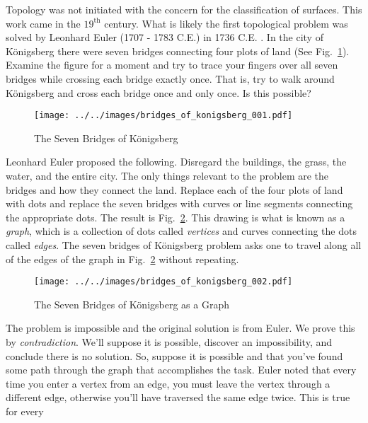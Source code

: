     Topology was not initiated with the concern for the classification of
    surfaces. This work came in the $19^{\textrm{th}}$ century. What is likely
    the first topological problem was solved by Leonhard Euler
    (1707 - 1783 C.E.) in 1736 C.E. \cite{LeonhardEulerBridgesOfKonigsberg}. In
    the city of K\"{o}nigsberg there were seven bridges connecting four plots of
    land (See Fig.~\ref{fig:bridges_of_konigsberg_001}). Examine the figure for
    a moment and try to trace your fingers over all seven bridges while crossing
    each bridge exactly once. That is, try to walk around K\"{o}nigsberg and
    cross each bridge once and only once. Is this possible?
    \begin{figure}
        \centering
        \texttt{[image: ../../images/bridges\_of\_konigsberg\_001.pdf]}
        \caption{The Seven Bridges of K\"{o}nigsberg}
        \label{fig:bridges_of_konigsberg_001}
    \end{figure}
    Leonhard Euler proposed the following. Disregard the buildings, the grass,
    the water, and the entire city. The only things relevant to the problem are
    the bridges and how they connect the land. Replace each of the four plots
    of land with dots and replace the seven bridges with curves or
    line segments connecting the appropriate dots. The result is
    Fig.~\ref{fig:bridges_of_konigsberg_002}. This drawing is what is known as
    a \textit{graph}, which is a collection of dots called
    \textit{vertices} and curves connecting the dots called
    \textit{edges}. The seven bridges of K\"{o}nigsberg problem asks one to
    travel along all of the edges of the graph in
    Fig.~\ref{fig:bridges_of_konigsberg_002} without repeating.
    \par\hfill\par
    \begin{figure}
        \centering
        \texttt{[image: ../../images/bridges\_of\_konigsberg\_002.pdf]}
        \caption{The Seven Bridges of K\"{o}nigsberg as a Graph}
        \label{fig:bridges_of_konigsberg_002}
    \end{figure}
    The problem is impossible and the original solution is from Euler. We prove
    this by \textit{contradiction}. We'll suppose it is possible, discover an
    impossibility, and conclude there is no solution. So, suppose
    it is possible and that you've found some path through the graph that
    accomplishes the task. Euler noted that every time you enter a vertex from
    an edge, you must leave the vertex through a different edge,
    otherwise you'll have traversed the same edge twice. This is true for every
